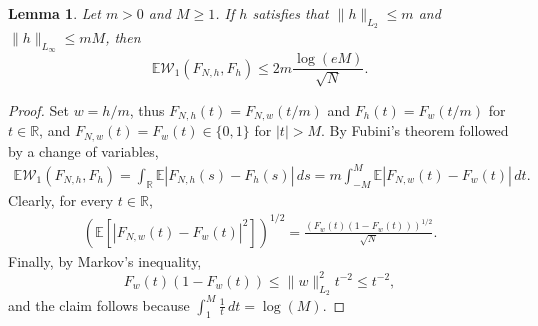 \documentclass[11pt]{amsart}
\newcommand{\R}{\mathbb{R}}
\newcommand{\W}{\mathcal{W}}
\newtheorem{lemma}[theorem]{Lemma}
\theoremstyle{definition}
\newcommand{\E}{\mathbb{E}}
\numberwithin{equation}{section}
\begin{document}
\begin{lemma}
\label{lem:W1.exp.bounded}
	Let $m>0$ and  $M\geq 1$.
	If $h$ satisfies that  $\|h\|_{L_{2}}\leq m$ and $\|h\|_{L_{\infty}}\leq m M$, then
	\[  \E \W_{1}(F_{N ,h }, F_{h } )  
\leq 2m \frac{\log(eM)  }{\sqrt N}.\]
\end{lemma}
\begin{proof}
	Set $w=h/m$, thus $F_{N,h}(t) = F_{N,w}(t/m)$ and $F_{h}(t) = F_{w}(t/m)$ for $t\in\R$, and $F_{N,w}(t) = F_{ w} (t)\in\{0,1\}$ for $|t|>M$.
	By Fubini's theorem followed by a change of variables,
\begin{align*}
 \E \W_{1}(F_{N,h }, F_{ h } )  
 = \int_{\R} \E |F_{N,h }(s) - F_{ h} (s)| \, ds
= m \int_{-M}^{M} \E |F_{N,w}(t) - F_{ w} (t)| \, dt.
\end{align*}
Clearly, for every $t\in\R$,
\begin{align*}
\left( \E[|F_{N, w}(t) - F_{ w } (t)|^{2} ] \right)^{1/2}
=  \frac{ (F_{w}(t)  (1- F_{ w }(t)) )^{1/2} }{ \sqrt N} .
\end{align*}
Finally, by Markov's inequality, 
\[F_{w}(t)  (1- F_{ w} (t))\leq \|w\|_{L_{2}}^{2} t^{{-2}} \leq  t^{{-2}} ,\]
and  the claim follows because  $\int_{1}^{M} \frac{1}{t} \,dt= \log(M)$.
\end{proof}
\end{document}
